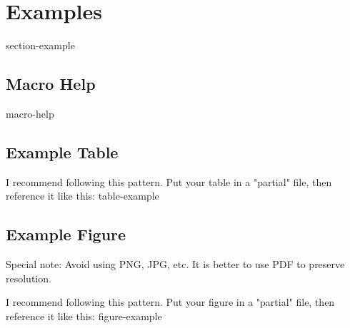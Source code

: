 \chapter{Examples}

{section-example}

\section{Macro Help}
{macro-help}


\section{Example Table}
I recommend following this pattern. Put your table in a "partial" file, then reference it like this:
{table-example}


\section{Example Figure}
Special note: Avoid using PNG, JPG, etc. It is better to use PDF to preserve resolution.

I recommend following this pattern. Put your figure in a "partial" file, then reference it like this:
{figure-example}



